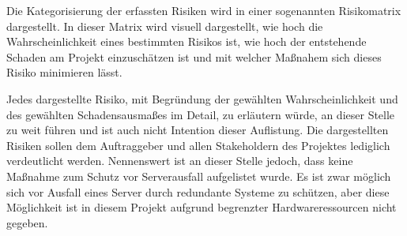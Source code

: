 Die Kategorisierung der erfassten Risiken wird in einer sogenannten Risikomatrix
dargestellt. In dieser Matrix wird visuell dargestellt, wie hoch die Wahrscheinlichkeit eines
bestimmten Risikos ist, wie hoch der entstehende Schaden am Projekt
einzuschätzen ist und mit welcher Maßnahem sich dieses Risiko minimieren lässt.

\clearpage
{}

Jedes dargestellte Risiko, mit Begründung der gewählten Wahrscheinlichkeit und des gewählten
Schadensausmaßes im Detail, zu erläutern würde, an dieser Stelle zu weit führen
und ist auch nicht Intention dieser Auflistung. Die dargestellten Risiken
sollen dem Auftraggeber und allen Stakeholdern des Projektes lediglich verdeutlicht
werden. Nennenswert ist an dieser Stelle jedoch, dass keine Maßnahme zum Schutz vor
Serverausfall aufgelistet wurde. Es ist zwar möglich sich vor
Ausfall eines Server durch redundante Systeme zu schützen, aber diese Möglichkeit
ist in diesem Projekt aufgrund begrenzter Hardwareressourcen nicht gegeben.